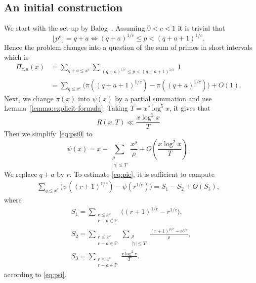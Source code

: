 \documentclass[12pt, reqno, twoside, letterpaper]{amsart}
\numberwithin{equation}{section}
\newcommand{\PP}{\ensuremath{\mathbb{P}}}
\theoremstyle{customthm}
\theoremstyle{customrem}
\begin{document}
\subsection{An initial construction}
We start with the set-up by Balog~\cite{Balog}. Assuming $0<c<1$ it is trivial that
$$
\lfloor p^c \rfloor =q+a   \Leftrightarrow (q+a)^{1/c} \leqslant p <(q+a+1)^{1/c}.
$$
Hence the problem changes into a question of the sum of primes in short intervals which is 
\begin{align}
\label{eq:pic}
\Pi_{c,a}(x) &=\sum_{q+a\leqslant x^c} \sum_{\substack{ (q+a)^{1/c} \leqslant p <(q+a+1)^{1/c}}}1 \nonumber \\
&= \sum_{q\leqslant x^c} \big( \pi((q+a+1)^{1/c})-\pi((q+a)^{1/c}) \big)+O(1).
\end{align}
Next, we change $\pi(x)$ into $\psi(x)$ by a partial summation and use Lemma~\ref{lemma:explicit-formula}. Taking $T=x^c\log^5x$, it gives that
$$
R(x,T)\ll \frac{x\log ^2x}{T}
$$
Then we simplify~\eqref{eq:psi0} to
\begin{equation}
\label{eq:psi}
\psi(x)=x-\sum_{\substack{\rho \\ |\gamma|\leqslant T}}\frac{x^\rho}{\rho}+O(\frac{x\log ^2x}{T}).
\end{equation}
We replace $q+a$ by $r$. To estimate \eqref{eq:pic}, it is sufficient to compute
\begin{align*}
\sum_{q\leqslant x^c} \bigg( \psi((r+1)^{1/c})-\psi(r^{1/c}) \bigg) = S_1 - S_2 + O(S_3),
\end{align*}
where
\begin{align*}
	&S_1=\sum_{\substack{r\leqslant x^c \\ r-a \in\PP}} \bigg( (r+1)^{1/c}-r^{1/c} \bigg),\\
	&S_2=\sum_{\substack{r\leqslant x^c \\ r-a \in\PP}}  \sum_{\substack{\rho \\ |\gamma| \leqslant T}}\frac{(r+1)^{\rho/c} - r^{\rho/c}}{\rho} ,\\
	&S_3= \sum_{\substack{r\leqslant x^c \\ r-a \in\PP}} \frac{r\log^2 r}{T}.
\end{align*}
according to \eqref{eq:psi}.
\end{document}
